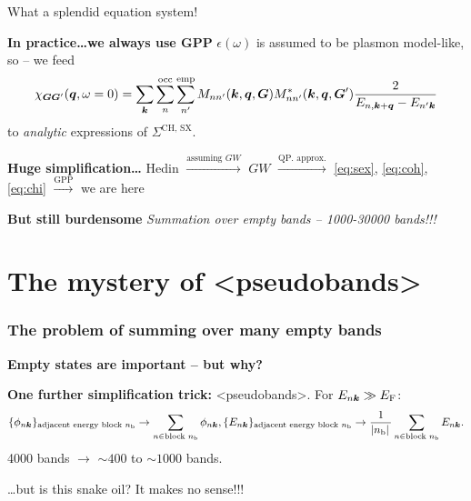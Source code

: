 \documentclass[t]{beamer}
\newcommand{\shortcode}[1]{\texttt{#1}}
\def\\{}%
\def\texttt#1{<#1>}%
\begin{document}
\begin{frame}[allowframebreaks]
What a splendid equation system! 

\textbf{In practice\dots we always use GPP} $\epsilon(\omega)$ is assumed to be 
plasmon model-like, so -- we feed 
\begin{equation}
    \chi_{\vb*{G} \vb*{G}'}(\vb*{q}, \omega=0)
    = \sum_{\vb*{k}} \sum_{n}^{\text{occ}} \sum_{n'}^{\text{emp}} 
    M_{n n'} (\vb*{k}, \vb*{q}, \vb*{G}) M^*_{nn'} (\vb*{k}, \vb*{q}, \vb*{G}') 
    \frac{
        2
    }{
        E_{n, \vb*{k} + \vb*{q}} - E_{n' \vb*{k}} 
    }
\end{equation}
to \emph{analytic} expressions of $\Sigma^{\text{CH, SX}}$.

\vspace{1cm}

\textbf{Huge simplification\dots} Hedin $\stackrel{\text{assuming $GW$}}{\rightarrow}$ 
$GW$ $\stackrel{\text{QP. approx.}}{\rightarrow}$ 
\eqref{eq:sex}, \eqref{eq:coh}, \eqref{eq:chi} $\stackrel{\text{GPP}}{\rightarrow}$ we are here

\textbf{But still burdensome} \emph{Summation over empty bands -- 1000-30000 bands!!!}

\end{frame}

\section{The mystery of \shortcode{pseudobands}}

\begin{frame}
\frametitle{The problem of summing over many empty bands}

\textbf{Empty states are important -- but why?}

\vspace{1cm}

\textbf{One further simplification trick:} \shortcode{pseudobands}. 
For $E_{n \vb*{k}} \gg E_{\text{F}}$:
\[
    \begin{aligned}
        \{ \phi_{n \vb*{k}} \}_{\text{adjacent energy block $n_{\text{b}}$}} 
        \rightarrow \sum_{n \in \text{block $n_{\text{b}}$}} \phi_{n \vb*{k}}, \\
        \{ E_{n \vb*{k}} \}_{\text{adjacent energy block $n_{\text{b}}$}} \rightarrow
        \frac{1}{\abs*{n_{\text{b}}}}  \sum_{n \in \text{block $n_{\text{b}}$}} E_{n \vb*{k}}.
    \end{aligned}
\]
4000 bands $\to$ $\sim 400$ to $\sim 1000$ bands.

\vspace{1cm}

\dots but is this snake oil? It makes no sense!!!

\end{frame}
\end{document}
